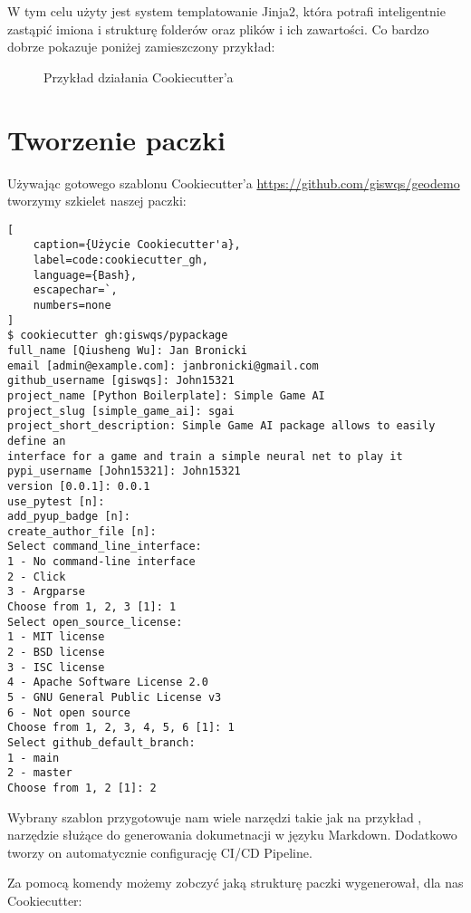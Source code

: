 W tym celu użyty jest system templatowanie Jinja2, która potrafi inteligentnie zastąpić imiona i strukturę folderów oraz plików i ich zawartości. Co bardzo dobrze pokazuje poniżej zamieszczony przykład:

\begin{figure}[h]
    \centering
    \caption{Przykład działania Cookiecutter'a \cite{CookiecutterExample}}
    \label{img:cookiecutter_example}
\end{figure}


\clearpage
\section{Tworzenie paczki}

Używając gotowego szablonu Cookiecutter'a
\url{https://github.com/giswqs/geodemo} tworzymy szkielet naszej paczki:

\begin{onepage}
    \begin{lstlisting}[
    caption={Użycie Cookiecutter'a},
    label=code:cookiecutter_gh,
    language={Bash},
    escapechar=`,
    numbers=none
]
$ cookiecutter gh:giswqs/pypackage
full_name [Qiusheng Wu]: Jan Bronicki
email [admin@example.com]: janbronicki@gmail.com
github_username [giswqs]: John15321
project_name [Python Boilerplate]: Simple Game AI
project_slug [simple_game_ai]: sgai
project_short_description: Simple Game AI package allows to easily define an
interface for a game and train a simple neural net to play it
pypi_username [John15321]: John15321
version [0.0.1]: 0.0.1
use_pytest [n]:
add_pyup_badge [n]:
create_author_file [n]:
Select command_line_interface:
1 - No command-line interface
2 - Click
3 - Argparse
Choose from 1, 2, 3 [1]: 1
Select open_source_license:
1 - MIT license
2 - BSD license
3 - ISC license
4 - Apache Software License 2.0
5 - GNU General Public License v3
6 - Not open source
Choose from 1, 2, 3, 4, 5, 6 [1]: 1
Select github_default_branch:
1 - main
2 - master
Choose from 1, 2 [1]: 2
\end{lstlisting}
\end{onepage}

Wybrany szablon przygotowuje nam wiele narzędzi takie jak na przykład , narzędzie służące do generowania dokumetnacji w języku Markdown.
Dodatkowo tworzy on automatycznie configurację CI/CD Pipeline.

\clearpage

Za pomocą komendy  możemy zobczyć jaką strukturę paczki wygenerował, dla nas Cookiecutter:

